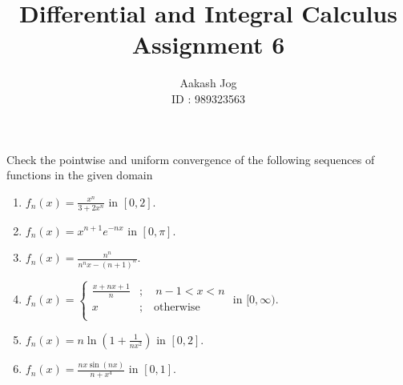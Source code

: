\documentclass[fleqn, a4paper, 12pt, oneside]{amsart}
\title
{
	Differential and Integral Calculus\\
	Assignment 6
}
\author
{
	Aakash Jog\\
	ID : 989323563
}
\date{\formatdate{14}{5}{2015}}
\theoremstyle{definition}
\theoremstyle{theorem}
\begin{document}
	
\maketitle

\begin{question}
	Check the pointwise and uniform convergence of the following sequences of functions in the given domain
	\begin{enumerate}
		\item $f_n(x) = \frac{x^n}{3 + 2 x^n}$ in $[0,2]$.
		\item $f_n(x) = x^{n + 1} e^{-n x}$ in $[0,\pi]$.
		\item $f_n(x) = \frac{n^n}{n^n x - (n + 1)^n}$.
		\item 
			$
				f_n(x) =
					\begin{cases}
						\frac{x + n x + 1}{n} & ;\quad n - 1 < x < n    \\
						x                     & ;\quad \text{otherwise} \\
					\end{cases}
			$
			in $[0,\infty)$.
		\item $f_n(x) = n \ln \left( 1 + \frac{1}{n x^2} \right)$ in $[0,2]$.
		\item $f_n(x) = \frac{n x \sin(n x)}{n + x^4}$ in $[0,1]$.
	\end{enumerate}
\end{question}
\end{document}
